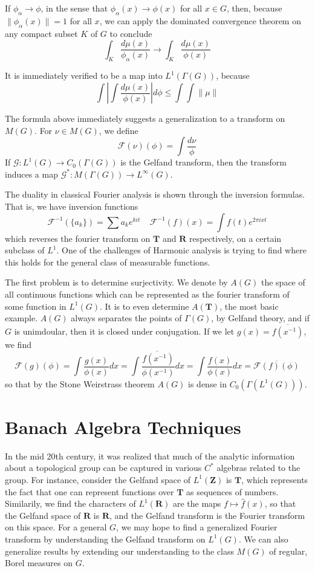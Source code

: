 If $\phi_\alpha \to \phi$, in the sense that $\phi_\alpha(x) \to \phi(x)$ for all $x \in G$, then, because $\| \phi_\alpha(x) \| = 1$ for all $x$, we can apply the dominated convergence theorem on any compact subset $K$ of $G$ to conclude
%
\[ \int_K \frac{d\mu(x)}{\phi_\alpha(x)} \to \int_K \frac{d\mu(x)}{\phi(x)} \]

It is immediately verified to be a map into $L^1(\Gamma(G))$, because
%
\[ \int \left| \int \frac{d\mu(x)}{\phi(x)} \right| d\phi \leq \int \int \| \mu \| \]

The formula above immediately suggests a generalization to a transform on $M(G)$. For $\nu \in M(G)$, we define
%
\[ \mathcal{F}(\nu)(\phi) = \int \frac{d \nu}{\phi} \]
%
If $\mathcal{G}: L^1(G) \to C_0(\Gamma(G))$ is the Gelfand transform, then the transform induces a map $\mathcal{G}^* : M(\Gamma(G)) \to L^\infty(G)$.

The duality in classical Fourier analysis is shown through the inversion formulas. That is, we have inversion functions
%
\[ \mathcal{F}^{-1}(\{ a_k \}) = \sum a_k e^{kit}\ \ \ \ \ \mathcal{F}^{-1}(f)(x) = \int f(t) e^{2 \pi i x t} \]
%
which reverses the fourier transform on $\mathbf{T}$ and $\mathbf{R}$ respectively, on a certain subclass of $L^1$. One of the challenges of Harmonic analysis is trying to find where this holds for the general class of measurable functions.

The first problem is to determine surjectivity. We denote by $A(G)$ the space of all continuous functions which can be represented as the fourier transform of some function in $L^1(G)$. It is to even determine $A(\mathbf{T})$, the most basic example. $A(G)$ always separates the points of $\Gamma(G)$, by Gelfand theory, and if $G$ is unimdoular, then it is closed under conjugation. If we let $g(x) = \overline{f(x^{-1})}$, we find
%
\[ \mathcal{F}(g)(\phi) = \int \frac{g(x)}{\phi(x)} dx = \overline{ \int \frac{f(x^{-1})}{\phi(x^{-1})} dx } = \int \frac{f(x)}{\phi(x)} dx = \overline{\mathcal{F}(f)(\phi)} \]
%
so that by the Stone Weirstrass theorem $A(G)$ is dense in $C_0(\Gamma(L^1(G)))$.

\chapter{Banach Algebra Techniques}

In the mid 20th century, it was realized that much of the analytic information about a topological group can be captured in various $C^*$ algebras related to the group. For instance, consider the Gelfand space of $L^1(\mathbf{Z})$ is $\mathbf{T}$, which represents the fact that one can represent functions over $\mathbf{T}$ as sequences of numbers. Similarily, we find the characters of $L^1(\mathbf{R})$ are the maps $f \mapsto \widehat{f}(x)$, so that the Gelfand space of $\mathbf{R}$ is $\mathbf{R}$, and the Gelfand transform is the Fourier transform on this space. For a general $G$, we may hope to find a generalized Fourier transform by understanding the Gelfand transform on $L^1(G)$. We can also generalize results by extending our understanding to the class $M(G)$ of regular, Borel measures on $G$.

